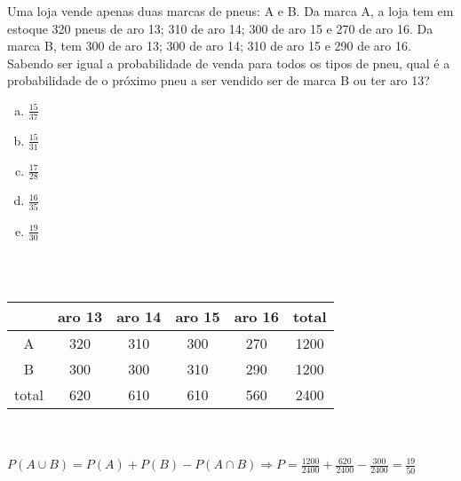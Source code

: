 \begin{ex}
Uma loja vende apenas duas marcas de pneus: A e B. Da marca A, a loja tem em estoque 320 pneus de aro 13; 310 de aro 14; 300 de aro 15 e 270 de aro 16. Da marca B, tem 300 de aro 13; 300 de aro 14; 310 de aro 15 e 290 de aro 16. Sabendo ser igual a probabilidade de venda para todos os tipos de pneu, qual é a probabilidade de o próximo pneu a ser vendido ser de marca B ou ter aro 13?
   \begin{enumerate}[(a)]
   \item $\frac{15}{37}$
   \item $\frac{15}{31}$
   \item $\frac{17}{28}$
   \item $\frac{16}{35}$
   \item $\frac{19}{30}$
   \end{enumerate}
     \begin{sol}
        \phantom{A} \\ \\
        \begin{tabular}{|c|c|c|c|c|c|} \hline
             & aro 13 & aro 14 & aro 15 & aro 16 & total \\ \hline 
          A & 320 & 310 & 300 & 270 & 1200  \\  \hline
          B & 300 & 300 & 310 & 290 & 1200  \\  \hline
      total & 620 & 610 & 610 & 560 & 2400  \\  \hline
        \end{tabular} 
        \\   \\
        $P(A\cup B)= P(A)+P(B)-P(A \cap B) \Longrightarrow P= \frac{1200}{2400}+\frac{620}{2400}-\frac{300}{2400}=\frac{19}{50}$
     \end{sol}
\end{ex}